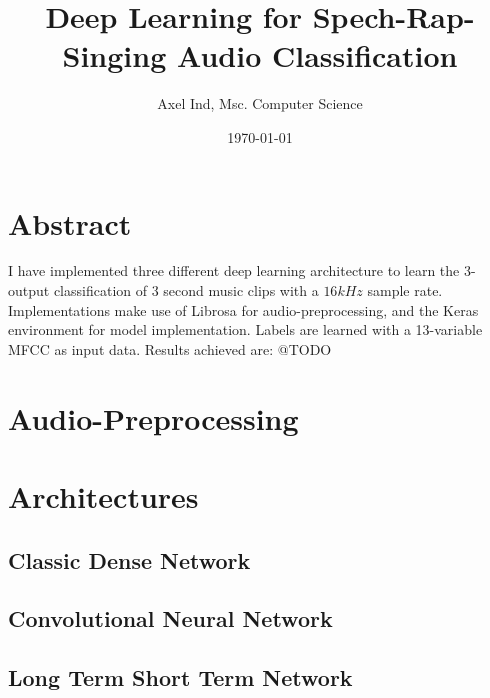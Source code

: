 \documentclass[12pt]{article}
\title{Deep Learning for Spech-Rap-Singing Audio Classification}
\date{\today}
\author{Axel Ind, Msc. Computer Science}
\begin{document}
\maketitle

\section*{Abstract}
I have implemented three different deep learning architecture to learn the 3-output classification of 3 second music clips with a $16kHz$ sample rate. Implementations make use of Librosa for audio-preprocessing, and the Keras environment for model implementation. Labels are learned with a 13-variable MFCC as input data. Results achieved are: @TODO

\section{Audio-Preprocessing}

\section{Architectures}
\subsection{Classic Dense Network}

\subsection{Convolutional Neural Network}

\subsection{Long Term Short Term Network}
\end{document}
